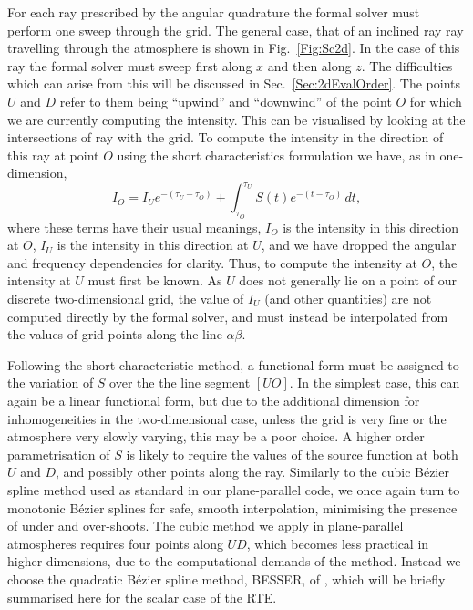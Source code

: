 For each ray prescribed by the angular quadrature the formal solver must perform one sweep through the grid.
The general case, that of an inclined ray ray travelling through the atmosphere is shown in Fig.~\ref{Fig:Sc2d}.
In the case of this ray the formal solver must sweep first along $x$ and then along $z$.
The difficulties which can arise from this will be discussed in Sec.~\ref{Sec:2dEvalOrder}.
The points $U$ and $D$ refer to them being ``upwind'' and ``downwind'' of the point $O$ for which we are currently computing the intensity.
This can be visualised by looking at the intersections of ray with the grid.
To compute the intensity in the direction of this ray at point $O$ using the short characteristics formulation we have, as in one-dimension,
\begin{equation}\label{Eq:MiniScDefinition}
   I_O = I_U e^{-(\tau_U - \tau_O)} + \int_{\tau_O}^{\tau_U} S(t) e^{-(t - \tau_O)}\, dt,
\end{equation}
where these terms have their usual meanings, $I_O$ is the intensity in this direction at $O$, $I_U$ is the intensity in this direction at $U$, and we have dropped the angular and frequency dependencies for clarity.
Thus, to compute the intensity at $O$, the intensity at $U$ must first be known.
As $U$ does not generally lie on a point of our discrete two-dimensional grid, the value of $I_U$ (and other quantities) are not computed directly by the formal solver, and must instead be interpolated from the values of grid points along the line $\alpha\beta$.

Following the short characteristic method, a functional form must be assigned to the variation of $S$ over the the line segment $[UO]$.
In the simplest case, this can again be a linear functional form, but due to the additional dimension for inhomogeneities in the two-dimensional case, unless the grid is very fine or the atmosphere very slowly varying, this may be a poor choice.
A higher order parametrisation of $S$ is likely to require the values of the source function at both $U$ and $D$, and possibly other points along the ray.
Similarly to the cubic Bézier spline method used as standard in our plane-parallel code, we once again turn to monotonic Bézier splines for safe, smooth interpolation, minimising the presence of under and over-shoots.
The cubic method we apply in plane-parallel atmospheres requires four points along $UD$, which becomes less practical in higher dimensions, due to the computational demands of the method.
Instead we choose the quadratic Bézier spline method, BESSER, of \citet{Stepan2013}, which will be briefly summarised here for the scalar case of the RTE.

